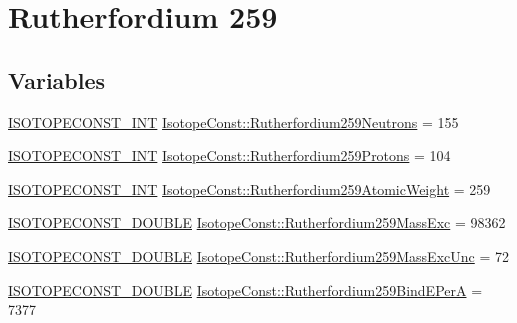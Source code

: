 \hypertarget{group___isotope_const-_rutherfordium-_rf259}{}\section{Rutherfordium 259}
\label{group___isotope_const-_rutherfordium-_rf259}
\subsection*{Variables}
\begin{DoxyCompactItemize}
\item 
\mbox{\hyperlink{group___isotope_const-_macros_ga5f18360b3e99483a35c32d789e62621c}{I\+S\+O\+T\+O\+P\+E\+C\+O\+N\+S\+T\+\_\+\+I\+NT}} \mbox{\hyperlink{group___isotope_const-_rutherfordium-_rf259_ga3f0a2fc33a7b20bada6dc76f7b9d38e2}{Isotope\+Const\+::\+Rutherfordium259\+Neutrons}} = 155
\item 
\mbox{\hyperlink{group___isotope_const-_macros_ga5f18360b3e99483a35c32d789e62621c}{I\+S\+O\+T\+O\+P\+E\+C\+O\+N\+S\+T\+\_\+\+I\+NT}} \mbox{\hyperlink{group___isotope_const-_rutherfordium-_rf259_gada39eb79bfd59a5eccddf2b371a70aef}{Isotope\+Const\+::\+Rutherfordium259\+Protons}} = 104
\item 
\mbox{\hyperlink{group___isotope_const-_macros_ga5f18360b3e99483a35c32d789e62621c}{I\+S\+O\+T\+O\+P\+E\+C\+O\+N\+S\+T\+\_\+\+I\+NT}} \mbox{\hyperlink{group___isotope_const-_rutherfordium-_rf259_ga84e82a66ef4ccf843815c4067e66a2c9}{Isotope\+Const\+::\+Rutherfordium259\+Atomic\+Weight}} = 259
\item 
\mbox{\hyperlink{group___isotope_const-_macros_ga8f45a7272ce02c0b4c65c44636ed719a}{I\+S\+O\+T\+O\+P\+E\+C\+O\+N\+S\+T\+\_\+\+D\+O\+U\+B\+LE}} \mbox{\hyperlink{group___isotope_const-_rutherfordium-_rf259_ga4dfe8c9a281eef90dac159dce3ff9e86}{Isotope\+Const\+::\+Rutherfordium259\+Mass\+Exc}} = 98362
\item 
\mbox{\hyperlink{group___isotope_const-_macros_ga8f45a7272ce02c0b4c65c44636ed719a}{I\+S\+O\+T\+O\+P\+E\+C\+O\+N\+S\+T\+\_\+\+D\+O\+U\+B\+LE}} \mbox{\hyperlink{group___isotope_const-_rutherfordium-_rf259_ga0a94abd4607aacd958c69df7d3282f61}{Isotope\+Const\+::\+Rutherfordium259\+Mass\+Exc\+Unc}} = 72
\item 
\mbox{\hyperlink{group___isotope_const-_macros_ga8f45a7272ce02c0b4c65c44636ed719a}{I\+S\+O\+T\+O\+P\+E\+C\+O\+N\+S\+T\+\_\+\+D\+O\+U\+B\+LE}} \mbox{\hyperlink{group___isotope_const-_rutherfordium-_rf259_gadc30ce4ff60ce5d79d129de704bad5cf}{Isotope\+Const\+::\+Rutherfordium259\+Bind\+E\+PerA}} = 7377

\end{DoxyCompactItemize}
